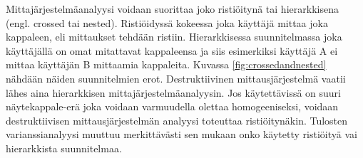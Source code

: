 \documentclass[12pt,a4paper,finnish]{tutthesis}
\begin{document}
Mittajärjestelmäanalyysi voidaan suorittaa joko ristiöitynä tai hierarkkisena
(engl. crossed tai nested). Ristiöidyssä kokeessa joka käyttäjä mittaa joka
kappaleen, eli mittaukset tehdään ristiin. Hierarkkisessa suunnitelmassa
joka käyttäjällä on omat mitattavat kappaleensa ja siis esimerkiksi käyttäjä
A ei mittaa käyttäjän B mittaamia kappaleita. Kuvassa \ref{fig:crossedandnested}
nähdään näiden suunnitelmien erot. Destruktiivinen mittausjärjestelmä
vaatii lähes aina hierarkkisen mittajärjestelmäanalyysin. Jos käytettävissä on
suuri näytekappale-erä joka voidaan varmuudella olettaa homogeeniseksi,
voidaan destruktiivisen mittausjärjestelmän analyysi toteuttaa ristiöitynäkin.
Tulosten varianssianalyysi muuttuu merkittävästi sen mukaan onko
käytetty ristiöityä vai hierarkkista suunnitelmaa.


\begin{figure}
  \begin{center}


\end{center}
\end{figure}
\end{document}
